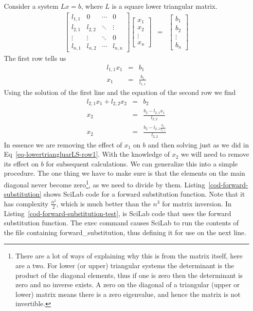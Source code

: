Consider a system $Lx=b$, where $L$ is a square lower triangular matrix.
\begin{eqnarray}
\left[\begin{matrix}
l_{1,1} & 0       & \cdots & 0 \\
l_{2,1} & l_{2,2} & \ddots & \vdots \\
\vdots  & \vdots  & \ddots & 0 \\
l_{n,1} & l_{n,2} & \cdots & l_{n,n}
\end{matrix}\right]
\left[\begin{matrix}
x_1 \\
x_2 \\
\vdots \\
x_n
\end{matrix}\right]
&=&
\left[\begin{matrix}
b_1 \\
b_2 \\
\vdots \\
b_n
\end{matrix}\right] \label{eq-lowertriangluarLS}
\end{eqnarray}
The first row tells us
\begin{eqnarray}
l_{1,1}x_1 &=& b_1 \nonumber \\
x_1 &=& \frac{b_1}{l_{1,1}} \label{eq-lowertriangluarLS-row1}
\end{eqnarray}
Using the solution of the first line and the equation of the second row we find
\begin{eqnarray}
l_{2,1}x_1 + l_{2,2}x_2 &=& b_2 \nonumber \\
x_2 &=& \frac{b_2-l_{2,1}x_1}{l_{2,2}} \\
x_2 &=& \frac{b_2-l_{2,1}\frac{b_1}{l_{1,1}}}{l_{2,2}} \nonumber
\end{eqnarray}
In essence we are removing the effect of $x_1$ on $b$ and then solving just as we did in Eq~\ref{eq-lowertriangluarLS-row1}.  With the knowledge of $x_2$ we will need to remove its effect on $b$ for subsequent calculations.  We can generalize this into a simple procedure.  The one thing we have to make sure is that the elements on the main diagonal never become zero\footnote{There are a lot of ways of explaining why this is from the matrix itself, here are a two.  For lower (or upper) triangular systems the determinant is the product of the diagonal elements, thus if one is zero then the determinant is zero and no inverse exists.  A zero on the diagonal of a triangular (upper or lower) matrix means there is a zero eigenvalue, and hence the matrix is not invertible.}, as we need to divide by them.
Listing~\ref{cod-forward-substitution} shows SciLab code for a forward substitution function.  Note that it has complexity $\frac{n^2}{2}$, which is much better than the $n^3$ for matrix inversion.  In Listing~\ref{cod-forward-substitution-test}, is SciLab code that uses the forward substitution function.  The exec command causes SciLab to run the contents of the file containing forward\_substitution, thus defining it for use on the next line.

